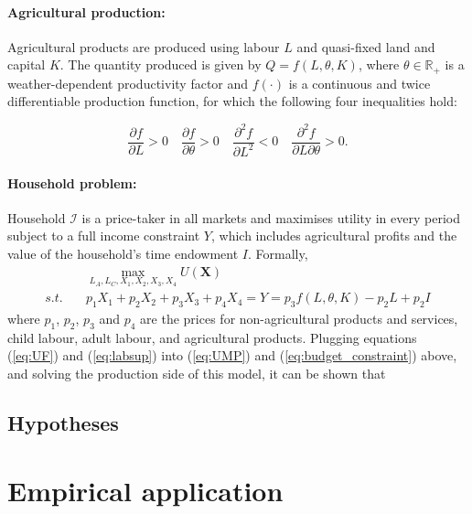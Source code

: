 \documentclass[a4paper,12pt]{article}
\theoremstyle{plain}
\theoremstyle{definition}
\theoremstyle{definition}
\theoremstyle{definition}
\theoremstyle{definition}
\begin{document}
\paragraph{Agricultural production:}
Agricultural products are produced using labour $L$ and quasi-fixed land and capital $K$. The quantity produced is given by $Q=f(L,\theta,K)$, where $\theta \in\mathbb{R}_+$ is a weather-dependent productivity factor and $f(\cdot)$ is a continuous and twice differentiable production function, for which the following four inequalities hold:

$$\frac{\partial f}{\partial L}>0 \quad \frac{\partial f}{\partial \theta}>0 \quad \frac{\partial^2 f}{\partial L^2}<0 \quad \frac{\partial^2 f}{\partial L \partial \theta}>0.$$

\paragraph{Household problem:}

Household $\mathcal{I}$ is a price-taker in all markets and maximises utility in every period subject to a full income constraint $Y$, which includes agricultural profits and the value of the household's time endowment $I$. Formally,
\begin{align}
\label{eq:UMP}
    &\max_{L_A, L_C,X_1, X_2, X_3, X_4} U(\mathbf{X})\\ 
\label{eq:budget_constraint}
    s.t.\quad& p_1 X_1 + p_2 X_2 + p_3 X_3 +p_4 X_4 = Y=p_3 f(L,\theta,K)-p_2L+p_2I
\end{align}
where $p_1$, $p_2$, $p_3$ and $p_4$ are the prices for non-agricultural products and services, child labour, adult labour, and agricultural products. Plugging equations (\ref{eq:UF}) and (\ref{eq:labsup}) into (\ref{eq:UMP}) and (\ref{eq:budget_constraint}) above, and solving the production side of this model, it can be shown that





\subsection{Hypotheses}

\section{Empirical application}
\label{sec:empirical_application}
\end{document}
